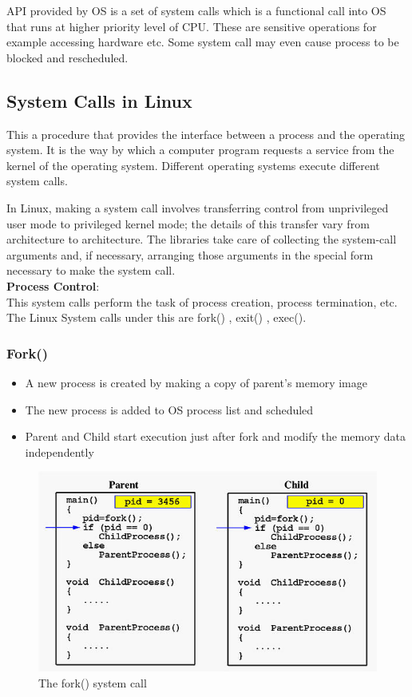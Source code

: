 \documentclass{article}
\begin{document}
API provided by OS is  a set of system calls which is a functional call into OS that runs at higher priority level of CPU. These are sensitive operations for example accessing hardware etc. Some system call may even cause process to be blocked and rescheduled.
\subsection{System Calls in Linux}
This a procedure that provides the interface between a process and the operating system. It is the way by which a computer program requests a service from the kernel of the operating system. Different operating systems execute different system calls.

In Linux, making a system call involves transferring control from unprivileged user mode to privileged kernel mode; the details of this transfer vary from architecture to architecture. The libraries take care of collecting the system-call arguments and, if necessary, arranging those arguments in the special form necessary to make the system call. \\
\textbf{Process Control}: \\
This system calls perform the task of process creation, process termination, etc. The Linux System calls under this are fork() , exit() , exec().
\subsubsection{Fork()}
\begin{itemize}
    \item A new process is created by making a copy of parent’s memory image
    \item The new process is added to OS process list and scheduled
    \item Parent and Child start execution just after fork and modify the memory data independently
\end{itemize}
    \begin{figure}[ht]
     \centering
     \includegraphics[scale = 0.565]{img/fork.jpg}
     \caption{The fork() system call}
    \end{figure}
\end{document}
